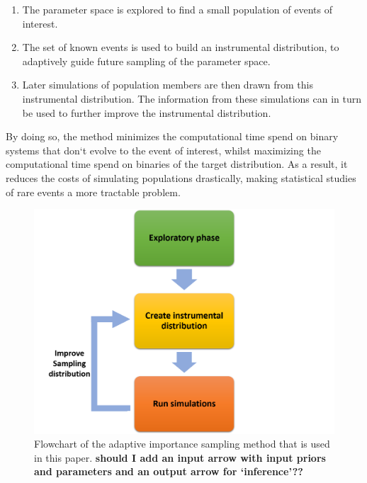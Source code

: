 \documentclass[a4paper,fleqn,usenatbib]{mnras}
\begin{document}
\begin{enumerate}
	\item  The parameter space is explored to find a small population of events of interest.
	\item  The set of known events is used to build an instrumental distribution, to adaptively
guide future sampling of the parameter space.
	\item  Later simulations of population members are then drawn from this instrumental
distribution. The information from these simulations can in turn be used to
further improve the instrumental distribution.

\end{enumerate}
By doing so, the method minimizes the computational time spend on binary systems that don`t evolve to the event of interest, whilst maximizing the computational time spend on binaries of the target distribution. As a result, it reduces the costs of simulating populations drastically,
making statistical studies of rare events a more tractable problem.



\begin{figure}
	\includegraphics[width=\columnwidth]{flowchartAISv2.png}
    \caption{Flowchart of the adaptive importance sampling method that is used in this paper.  \textbf{should I add an input arrow with input priors and parameters and an output arrow for `inference'??}}
    \label{fig:aIS_scheme}
\end{figure}
%


%
%
%
%
\end{document}
